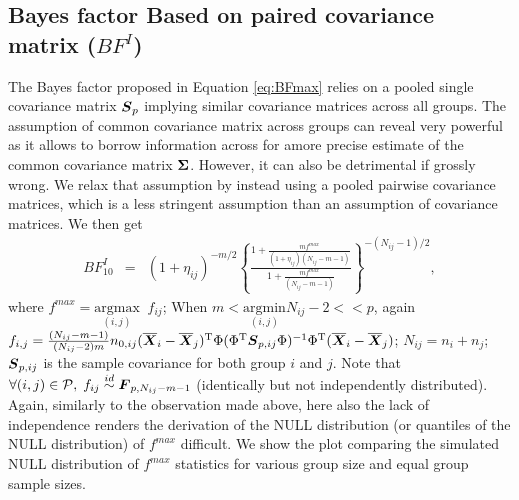 \documentclass[12pt]{article}
\def\be{\begin{eqnarray}}
\def\ee{\end{eqnarray}}
\def\trans{^{\rm T}}
\newcommand{\uF}       {\mbox{\boldmath$F$}}
\newcommand{\uI}       {\mbox{\boldmath$I$}}
\newcommand{\uR}       {\mbox{\boldmath$R$}}
\newcommand{\uS}       {\mbox{\boldmath$S$}}
\newcommand{\uX}       {\mbox{\boldmath$X$}}
\newcommand{\uSigma}            {\mbox{\boldmath$\Sigma$}}
\newcommand{\uPhi}              {\mbox{\boldmath$\Phi$}}
\begin{document}
\subsection{Bayes factor Based on paired covariance matrix ($BF^{I}$)} \label{sec:testid}
The Bayes factor proposed in Equation \ref{eq:BFmax} relies on a pooled single covariance matrix $\uS_p$ implying similar covariance matrices across all groups. The assumption of common covariance matrix across groups can reveal very powerful as it allows to borrow information across for amore precise estimate of the common covariance matrix $\uSigma$. However, it can also be detrimental if grossly wrong. We relax that assumption by instead using a pooled pairwise covariance matrices, which is a less stringent assumption than an assumption of covariance matrices. We then get
\be
BF^{I}_{10} &=& \left(1 + \eta_{ij} \right)^{-m/2} \left\{ \frac{  1 + \frac{m f^{max}}{(1 + \eta_{ij})(N_{ij}-m-1)}}{ 1 + \frac{m f^{max}}{(N_{ij}-m-1)}  } \right\}^{-(N_{ij}-1)/2}, \label{eq:BFmaxij}
\ee
where $f^{max} = \underset{(i,j)}{\mathrm{argmax}}\;\;f_{ij}$;
When $m < \underset{(i,j)}{\mathrm{argmin}} N_{ij} - 2 << p$, again $f_{i,j}  = \frac{(N_{ij}-m-1)}{(N_{ij}-2)m} n_{0,ij} (\overline{\uX}_i - \overline{\uX}_j)\trans\Phi (\Phi\trans\uS_{p,ij}\Phi)^{-1}\Phi\trans(\overline{\uX}_i - \overline{\uX}_j)$;
$N_{ij} = n_i +n_j$; $\uS_{p,ij}$ is the sample covariance for both group $i$ and $j$. Note that $\forall (i,j) \in \mathcal{P}, \; f_{ij} \stackrel{id}{\sim} \uF_{p, N_{ij} - m- 1}$ (identically but not independently distributed). Again, similarly to the observation made above, here also the lack of independence renders the derivation of the NULL distribution (or quantiles of the NULL distribution) of $f^{max}$ difficult. We show the plot comparing the simulated NULL distribution of $f^{max}$ statistics for various group size and equal group sample sizes.

\end{document}
